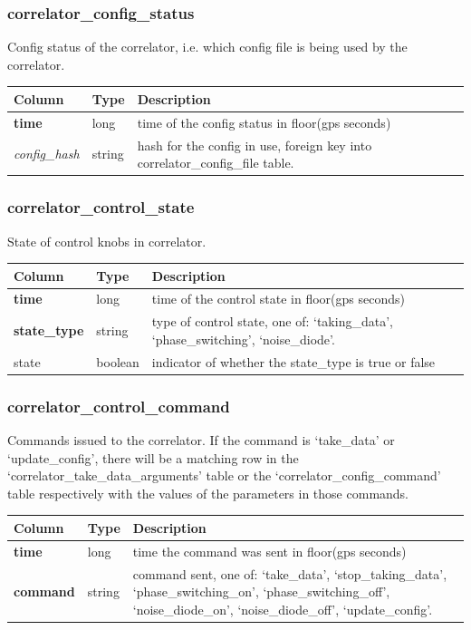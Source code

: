 \documentclass{article}
\begin{document}
{\subsubsection{correlator\_config\_status}
Config status of the correlator, i.e. which config file is being used by the correlator.
\begin{center}
 \begin{tabular}{| p{4cm} | p{2cm} | p{10cm} |}
\hline
 {\bf Column} & {\bf Type}  & {\bf Description} \\ [0.5ex]  \hline\hline
\textbf{time} & long & time of the config status in floor(gps seconds)\\ \hline
\textit{config\_hash} & string & hash for the config in use, foreign key into correlator\_config\_file table.\\ \hline
\end{tabular}
\end{center}


\subsubsection{correlator\_control\_state}
State of control knobs in correlator.
\begin{center}
 \begin{tabular}{| p{4cm} | p{2cm} | p{10cm} |}
\hline
 {\bf Column} & {\bf Type}  & {\bf Description} \\ [0.5ex]  \hline\hline
\textbf{time} & long & time of the control state in floor(gps seconds)\\ \hline
\textbf{state\_type} & string & type of control state, one of: `taking\_data', `phase\_switching',  `noise\_diode'.  \\ \hline
state & boolean & indicator of whether the state\_type is true or false \\\hline
\end{tabular}
\end{center}

\subsubsection{correlator\_control\_command}
Commands issued to the correlator. If the command is `take\_data' or `update\_config', there will be a matching row in the `correlator\_take\_data\_arguments' table or the `correlator\_config\_command' table respectively with the values of the parameters in those commands.
\begin{center}
 \begin{tabular}{| p{4cm} | p{2cm} | p{10cm} |}
\hline
 {\bf Column} & {\bf Type}  & {\bf Description} \\ [0.5ex]  \hline\hline
\textbf{time} & long & time the command was sent in floor(gps seconds)\\ \hline
\textbf{command} & string & command sent, one of: `take\_data', `stop\_taking\_data',  `phase\_switching\_on',  `phase\_switching\_off',  `noise\_diode\_on',  `noise\_diode\_off',  `update\_config'.  \\ \hline
\end{tabular}
\end{center}

}
\end{document}
